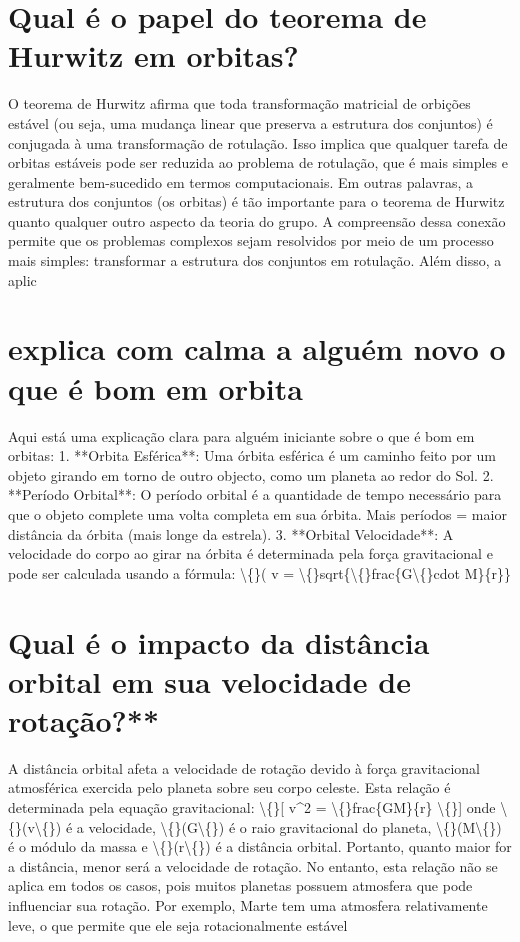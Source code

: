 \documentclass[11pt,a4paper]{article}
\begin{document}
\section{Qual é o papel do teorema de Hurwitz em orbitas?}
O teorema de Hurwitz afirma que toda transformação matricial de orbições estável (ou seja, uma mudança linear que preserva a estrutura dos conjuntos) é conjugada à uma transformação de rotulação. Isso implica que qualquer tarefa de orbitas estáveis pode ser reduzida ao problema de rotulação, que é mais simples e geralmente bem-sucedido em termos computacionais. Em outras palavras, a estrutura dos conjuntos (os orbitas) é tão importante para o teorema de Hurwitz quanto qualquer outro aspecto da teoria do grupo. A compreensão dessa conexão permite que os problemas complexos sejam resolvidos por meio de um processo mais simples: transformar a estrutura dos conjuntos em rotulação. Além disso, a aplic

\section{explica com calma a alguém novo o que é bom em orbita}
Aqui está uma explicação clara para alguém iniciante sobre o que é bom em orbitas: 1. **Orbita Esférica**: Uma órbita esférica é um caminho feito por um objeto girando em torno de outro objecto, como um planeta ao redor do Sol. 2. **Período Orbital**: O período orbital é a quantidade de tempo necessário para que o objeto complete uma volta completa em sua órbita. Mais períodos = maior distância da órbita (mais longe da estrela). 3. **Orbital Velocidade**: A velocidade do corpo ao girar na órbita é determinada pela força gravitacional e pode ser calculada usando a fórmula: \textbackslash\{\}( v = \textbackslash\{\}sqrt\{\textbackslash\{\}frac\{G\textbackslash\{\}cdot M\}\{r\}\}

\section{Qual é o impacto da distância orbital em sua velocidade de rotação?**}
A distância orbital afeta a velocidade de rotação devido à força gravitacional atmosférica exercida pelo planeta sobre seu corpo celeste. Esta relação é determinada pela equação gravitacional: \textbackslash\{\}[ v^2 = \textbackslash\{\}frac\{GM\}\{r\} \textbackslash\{\}] onde \textbackslash\{\}(v\textbackslash\{\}) é a velocidade, \textbackslash\{\}(G\textbackslash\{\}) é o raio gravitacional do planeta, \textbackslash\{\}(M\textbackslash\{\}) é o módulo da massa e \textbackslash\{\}(r\textbackslash\{\}) é a distância orbital. Portanto, quanto maior for a distância, menor será a velocidade de rotação. No entanto, esta relação não se aplica em todos os casos, pois muitos planetas possuem atmosfera que pode influenciar sua rotação. Por exemplo, Marte tem uma atmosfera relativamente leve, o que permite que ele seja rotacionalmente estável
\end{document}
